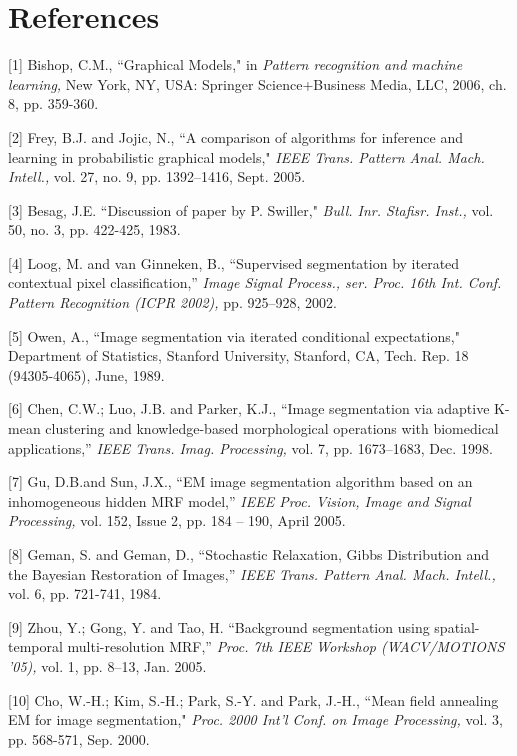 \documentclass{article} %
\begin{document}
\section{References}
\small{
[1] Bishop, C.M., ``Graphical Models," in \textit{Pattern recognition and machine learning,} New York, NY, USA: Springer Science+Business Media, LLC, 2006, ch. 8, pp. 359-360.

[2] Frey, B.J. and Jojic, N., ``A comparison of algorithms for inference and learning in probabilistic graphical models," \textit{IEEE Trans. Pattern Anal. Mach. Intell.,} vol. 27, no. 9, pp. 1392–1416, Sept. 2005.

[3] Besag, J.E. ``Discussion of paper by P. Swiller," \textit{Bull. Inr. Stafisr. Inst.,} vol. 50, no. 3, pp. 422-425, 1983.

[4] Loog, M. and van Ginneken, B., ``Supervised segmentation by iterated contextual pixel classification,” \textit{Image Signal Process., ser. Proc. 16th Int. Conf. Pattern Recognition (ICPR 2002),} pp. 925–928, 2002.

[5] Owen, A., ``Image segmentation via iterated conditional expectations," Department of Statistics, Stanford University, Stanford, CA, Tech. Rep. 18 (94305-4065), June, 1989.

[6] Chen, C.W.; Luo, J.B. and Parker, K.J., ``Image segmentation via adaptive K-mean clustering and knowledge-based morphological operations with biomedical applications,” \textit{IEEE Trans. Imag. Processing,} vol. 7, pp. 1673–1683, Dec. 1998.

[7] Gu, D.B.and Sun, J.X., ``EM image segmentation algorithm based on an inhomogeneous hidden MRF model,” \textit{IEEE Proc. Vision, Image and Signal Processing,} vol. 152, Issue 2, pp. 184 – 190, April 2005.

[8] Geman, S. and Geman, D., ``Stochastic Relaxation, Gibbs Distribution and the Bayesian Restoration of Images,” \textit{IEEE Trans. Pattern Anal. Mach. Intell.,} vol. 6, pp. 721-741, 1984.

[9] Zhou, Y.; Gong, Y. and Tao, H. ``Background segmentation using spatial-temporal multi-resolution MRF,” \textit{Proc. 7th IEEE Workshop (WACV/MOTIONS '05),} vol. 1, pp. 8–13, Jan. 2005.

[10] Cho, W.-H.; Kim, S.-H.; Park, S.-Y. and Park, J.-H., ``Mean field annealing EM for image segmentation," \textit{Proc. 2000 Int’l Conf. on Image Processing,} vol. 3, pp. 568-571, Sep. 2000.

}
\end{document}
